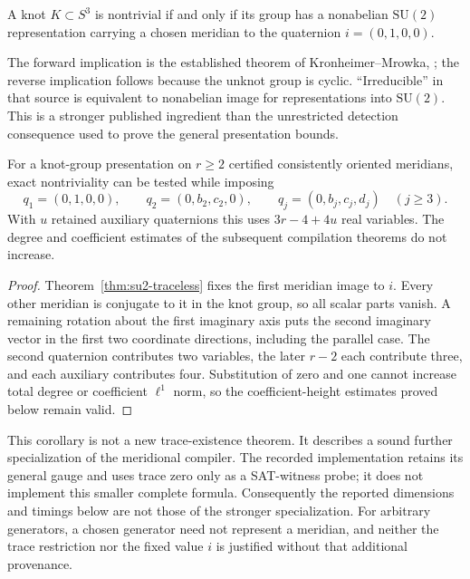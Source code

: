 \begin{theorem}
\label{thm:su2-traceless}
A knot $K\subset S^3$ is nontrivial if and only if its group has a
nonabelian $\mathrm{SU}(2)$ representation carrying a chosen meridian
to the quaternion $i=(0,1,0,0)$.
\end{theorem}

The forward implication is the established theorem of Kronheimer--Mrowka,
\cite[Corollary~7.17]{KM2010Excision}; the reverse implication follows
because the unknot group is cyclic. ``Irreducible'' in that source is
equivalent to nonabelian image for representations into $\mathrm{SU}(2)$.
This is a stronger published ingredient than the unrestricted detection
consequence used to prove the general presentation bounds.

\begin{corollary}
\label{cor:su2-fixed-meridian}
For a knot-group presentation on $r\ge2$ certified consistently oriented
meridians, exact nontriviality can be tested while imposing
\[
 q_1=(0,1,0,0),\qquad q_2=(0,b_2,c_2,0),\qquad
 q_j=(0,b_j,c_j,d_j)\quad(j\ge3).
\]
With $u$ retained auxiliary quaternions this uses $3r-4+4u$ real
variables. The degree and coefficient estimates of the subsequent
compilation theorems do not increase.
\end{corollary}

\begin{proof}
Theorem~\ref{thm:su2-traceless} fixes the first meridian image to $i$.
Every other meridian is conjugate to it in the knot group, so all scalar
parts vanish. A remaining rotation about the first imaginary axis puts
the second imaginary vector in the first two coordinate directions,
including the parallel case. The second quaternion contributes two
variables, the later $r-2$ each contribute three, and each auxiliary
contributes four. Substitution of zero and one cannot increase total
degree or coefficient $\ell^1$ norm, so the coefficient-height estimates
proved below remain valid.
\end{proof}

This corollary is not a new trace-existence theorem. It describes a
sound further specialization of the meridional compiler. The recorded
implementation retains its general gauge and uses trace zero only as a
SAT-witness probe; it does not implement this smaller complete formula.
Consequently the reported dimensions and timings below are not those of
the stronger specialization. For arbitrary generators, a chosen generator
need not represent a meridian, and neither the trace restriction nor the
fixed value $i$ is justified without that additional provenance.

